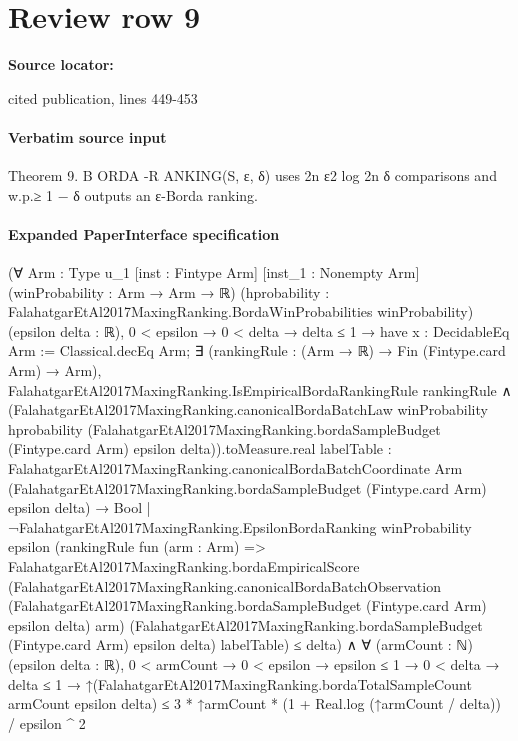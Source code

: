 \documentclass[10pt]{article}
\begin{document}
\section*{Review row 9}
\textbf{Source locator:} {\footnotesize\raggedright cited publication, lines 449-\allowbreak{}453\par}
\paragraph{Verbatim source input}
\begin{ReviewVerbatim}
Theorem 9. B ORDA -R ANKING(S, ε, δ) uses 2n   ε2
                                                  log 2n
                                                       δ
                                                          comparisons and w.p.≥ 1 − δ outputs an
ε-Borda ranking.
\end{ReviewVerbatim}



\paragraph{Expanded PaperInterface specification}
\begin{ReviewVerbatim}
(∀ {Arm : Type u_1} [inst : Fintype Arm] [inst_1 : Nonempty Arm] (winProbability : Arm → Arm → ℝ)
    (hprobability : FalahatgarEtAl2017MaxingRanking.BordaWinProbabilities winProbability) (epsilon delta : ℝ),
    0 < epsilon →
      0 < delta →
        delta ≤ 1 →
          have x : DecidableEq Arm := Classical.decEq Arm;
          ∃ (rankingRule : (Arm → ℝ) → Fin (Fintype.card Arm) → Arm),
            FalahatgarEtAl2017MaxingRanking.IsEmpiricalBordaRankingRule rankingRule ∧
              (FalahatgarEtAl2017MaxingRanking.canonicalBordaBatchLaw winProbability hprobability
                        (FalahatgarEtAl2017MaxingRanking.bordaSampleBudget (Fintype.card Arm) epsilon
                          delta)).toMeasure.real
                  {labelTable :
                    FalahatgarEtAl2017MaxingRanking.canonicalBordaBatchCoordinate Arm
                        (FalahatgarEtAl2017MaxingRanking.bordaSampleBudget (Fintype.card Arm) epsilon delta) →
                      Bool |
                    ¬FalahatgarEtAl2017MaxingRanking.EpsilonBordaRanking winProbability epsilon
                        (rankingRule fun (arm : Arm) =>
                          FalahatgarEtAl2017MaxingRanking.bordaEmpiricalScore
                            (FalahatgarEtAl2017MaxingRanking.canonicalBordaBatchObservation
                              (FalahatgarEtAl2017MaxingRanking.bordaSampleBudget (Fintype.card Arm) epsilon delta) arm)
                            (FalahatgarEtAl2017MaxingRanking.bordaSampleBudget (Fintype.card Arm) epsilon delta)
                            labelTable)} ≤
                delta) ∧
  ∀ (armCount : ℕ) (epsilon delta : ℝ),
    0 < armCount →
      0 < epsilon →
        epsilon ≤ 1 →
          0 < delta →
            delta ≤ 1 →
              ↑(FalahatgarEtAl2017MaxingRanking.bordaTotalSampleCount armCount epsilon delta) ≤
                3 * ↑armCount * (1 + Real.log (↑armCount / delta)) / epsilon ^ 2
\end{ReviewVerbatim}
\end{document}
